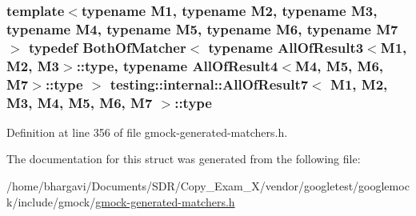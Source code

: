 \subsubsection[{\texorpdfstring{type}{type}}]{\setlength{\rightskip}{0pt plus 5cm}template$<$typename M1, typename M2, typename M3, typename M4, typename M5, typename M6, typename M7$>$ typedef {\bf Both\+Of\+Matcher}$<$ typename {\bf All\+Of\+Result3}$<$M1, M2, M3$>$\+::{\bf type}, typename {\bf All\+Of\+Result4}$<$M4, M5, M6, M7$>$\+::{\bf type} $>$ {\bf testing\+::internal\+::\+All\+Of\+Result7}$<$ M1, M2, M3, M4, M5, M6, M7 $>$\+::{\bf type}}\hypertarget{structtesting_1_1internal_1_1_all_of_result7_a47ab0d670258434b0e65530591948e8c}{}\label{structtesting_1_1internal_1_1_all_of_result7_a47ab0d670258434b0e65530591948e8c}


Definition at line 356 of file gmock-\/generated-\/matchers.\+h.



The documentation for this struct was generated from the following file\+:\begin{DoxyCompactItemize}
\item 
/home/bhargavi/\+Documents/\+S\+D\+R/\+Copy\+\_\+\+Exam\+\_\+X/vendor/googletest/googlemock/include/gmock/\hyperlink{gmock-generated-matchers_8h}{gmock-\/generated-\/matchers.\+h}\end{DoxyCompactItemize}
